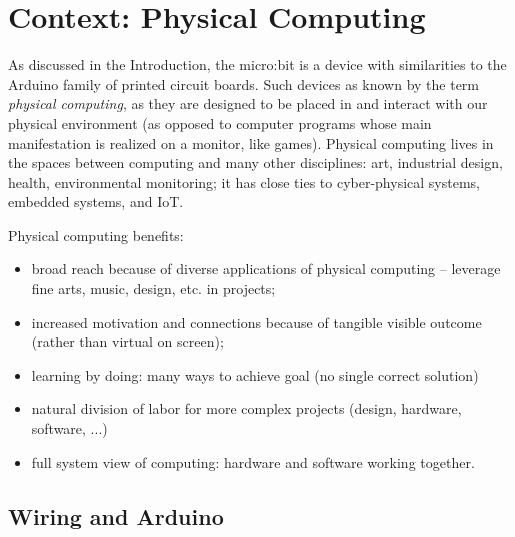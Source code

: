 \section{Context: Physical Computing}
\label{sec:domain}

As discussed in the Introduction, the micro:bit is a device
with similarities to the Arduino family of printed 
circuit boards. Such devices as known by the term
{\em physical computing}, as they are designed to be placed in and
interact with our physical environment (as opposed to computer programs
whose main manifestation is realized on a monitor, like games).  
Physical computing lives in the spaces between computing and many other disciplines:
art, industrial design, health, environmental monitoring; it has
close ties to cyber-physical systems, embedded systems, and IoT. 


%

Physical computing benefits:
\begin{itemize}
\item broad reach because of diverse applications of physical computing -- leverage fine arts, music, design, etc. in projects;
\item increased motivation and connections because of tangible visible outcome (rather than virtual on screen);
\item learning by doing: many ways to achieve goal (no single correct solution)
\item natural division of labor for more complex projects (design, hardware, software, ...)
\item full system view of computing: hardware and software working together.
\end{itemize}

\subsection{Wiring and Arduino}



